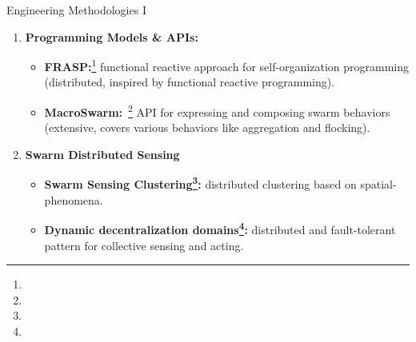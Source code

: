 \documentclass[presentation, 8pt,169]{beamer}\mode<presentation>{\usetheme{AMSBolognaFC}}
\begin{document}
\begin{frame}[fragile]{Engineering Methodologies I}

  \begin{enumerate}
  \item \textbf{Programming Models \& APIs:}
  
  \begin{itemize}
  \item \textbf{FRASP:}\footnote{} functional reactive approach for self-organization programming (distributed, inspired by functional reactive programming).
  \item \textbf{MacroSwarm:}~\footnote{} API for expressing and composing swarm behaviors (extensive, covers various behaviors like aggregation and flocking).
  \end{itemize}
  
  \item \textbf{Swarm Distributed Sensing}
  
  \begin{itemize}
  \item \textbf{Swarm Sensing Clustering\footnote{}:} distributed clustering based on spatial-phenomena.
  \item \textbf{Dynamic decentralization domains\footnote{}:} distributed and fault-tolerant pattern for collective sensing and acting.
  \end{itemize}
\end{enumerate}

\end{frame}
\end{document}

